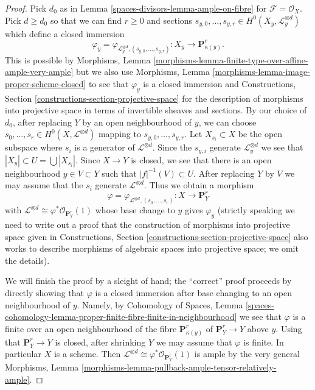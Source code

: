 \begin{proof}
Pick $d_0$ as in Lemma \ref{spaces-divisors-lemma-ample-on-fibre} for
$\mathcal{F} = \mathcal{O}_X$. Pick $d \geq d_0$
so that we can find $r \geq 0$ and sections
$s_{y, 0}, \ldots, s_{y, r} \in H^0(X_y, \mathcal{L}_y^{\otimes d})$
which define a closed immersion
$$
\varphi_y =
\varphi_{\mathcal{L}_y^{\otimes d}, (s_{y, 0}, \ldots, s_{y, r})} :
X_y \to \mathbf{P}^r_{\kappa(y)}.
$$
This is possible by Morphisms, Lemma
\ref{morphisms-lemma-finite-type-over-affine-ample-very-ample}
but we also use
Morphisms, Lemma \ref{morphisms-lemma-image-proper-scheme-closed}
to see that $\varphi_y$ is a closed immersion and
Constructions, Section \ref{constructions-section-projective-space}
for the description of morphisms into projective
space in terms of invertible sheaves and sections.
By our choice of $d_0$, after replacing $Y$ by an open neighbourhood
of $y$, we can choose
$s_0, \ldots, s_r \in H^0(X, \mathcal{L}^{\otimes d})$
mapping to $s_{y, 0}, \ldots, s_{y, r}$.
Let $X_{s_i} \subset X$ be the open subspace where $s_i$
is a generator of $\mathcal{L}^{\otimes d}$. Since
the $s_{y, i}$ generate $\mathcal{L}_y^{\otimes d}$ we see that
$|X_y| \subset U = \bigcup |X_{s_i}|$. Since $X \to Y$ is closed,
we see that there is an open neighbourhood $y \in V \subset Y$
such that $|f|^{-1}(V) \subset U$. After replacing $Y$ by $V$ we may
assume that the $s_i$ generate $\mathcal{L}^{\otimes d}$. Thus we
obtain a morphism
$$
\varphi = \varphi_{\mathcal{L}^{\otimes d}, (s_0, \ldots, s_r)} :
X \longrightarrow \mathbf{P}^r_Y
$$
with $\mathcal{L}^{\otimes d} \cong \varphi^*\mathcal{O}_{\mathbf{P}^r_Y}(1)$
whose base change to $y$ gives $\varphi_y$ (strictly speaking we need
to write out a proof that the construction of morphisms into projective
space given in
Constructions, Section \ref{constructions-section-projective-space}
also works to describe morphisms of algebraic spaces into projective
space; we omit the details).

\medskip\noindent
We will finish the proof by a sleight of hand; the ``correct'' proof
proceeds by directly showing that $\varphi$ is a closed
immersion after base changing to an open neighbourhood of $y$.
Namely, by
Cohomology of Spaces, Lemma
\ref{spaces-cohomology-lemma-proper-finite-fibre-finite-in-neighbourhood}
we see that $\varphi$ is a finite over an open neighbourhood
of the fibre $\mathbf{P}^r_{\kappa(y)}$ of $\mathbf{P}^r_Y \to Y$
above $y$. Using that $\mathbf{P}^r_Y \to Y$ is closed, after
shrinking $Y$ we may assume that $\varphi$ is finite.
In particular $X$ is a scheme.
Then $\mathcal{L}^{\otimes d} \cong \varphi^*\mathcal{O}_{\mathbf{P}^r_Y}(1)$
is ample by the very general
Morphisms, Lemma \ref{morphisms-lemma-pullback-ample-tensor-relatively-ample}.
\end{proof}

